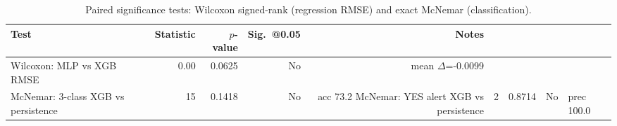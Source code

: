 \begin{table}[htbp]
\centering
\caption{Paired significance tests: Wilcoxon signed-rank (regression RMSE) and exact McNemar (classification).}
\label{tab:paired-tests}
\small
\begin{tabular}{@{}lrrrr@{}}
\toprule
\textbf{Test} & \textbf{Statistic} & \textbf{$p$-value} & \textbf{Sig.\ @0.05} & \textbf{Notes} \\
\midrule
Wilcoxon: MLP vs XGB RMSE & 0.00 & 0.0625 & No & mean $\Delta$=-0.0099 \\
McNemar: 3-class XGB vs persistence & 15 & 0.1418 & No & acc 73.2%
McNemar: YES alert XGB vs persistence & 2 & 0.8714 & No & prec 100.0%
\bottomrule
\end{tabular}
\end{table}
